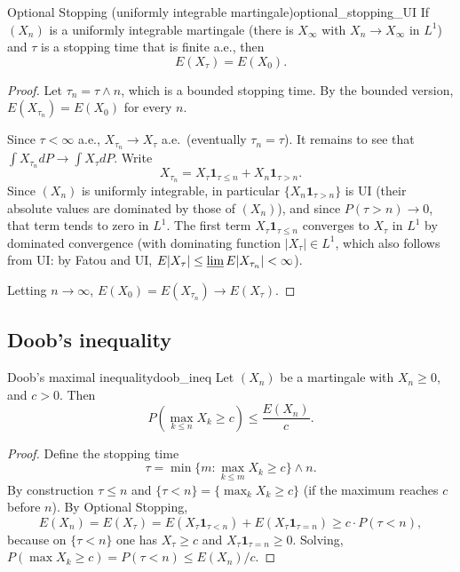 \documentclass[11pt, a4paper]{article}
\begin{document}
\begin{teorema}{Optional Stopping (uniformly integrable martingale)}{optional_stopping_UI}
If $(X_n)$ is a uniformly integrable martingale (there is $X_\infty$ with $X_n \to X_\infty$ in
$L^1$) and $\tau$ is a stopping time that is finite a.e., then
$$ E(X_\tau) = E(X_0). $$
\end{teorema}

\begin{proof}
Let $\tau_n = \tau \wedge n$, which is a bounded stopping time. By the bounded version,
$E(X_{\tau_n}) = E(X_0)$ for every $n$.

Since $\tau < \infty$ a.e., $X_{\tau_n} \to X_\tau$ a.e.\ (eventually $\tau_n = \tau$). It remains
to see that $\int X_{\tau_n} dP \to \int X_\tau dP$. Write
$$ X_{\tau_n} = X_\tau \mathbf{1}_{\tau \le n} + X_n \mathbf{1}_{\tau > n}. $$
Since $(X_n)$ is uniformly integrable, in particular $\{X_n \mathbf{1}_{\tau > n}\}$ is UI (their
absolute values are dominated by those of $(X_n)$), and since $P(\tau > n) \to 0$, that term
tends to zero in $L^1$. The first term $X_\tau \mathbf{1}_{\tau \le n}$ converges to $X_\tau$ in
$L^1$ by dominated convergence (with dominating function $|X_\tau| \in L^1$, which also follows from UI:
by Fatou and UI, $E|X_\tau| \le \varliminf E|X_{\tau_n}| < \infty$).

Letting $n \to \infty$, $E(X_0) = E(X_{\tau_n}) \to E(X_\tau)$.
\end{proof}

\subsection{Doob's inequality}

\begin{teorema}{Doob's maximal inequality}{doob_ineq}
Let $(X_n)$ be a martingale with $X_n \ge 0$, and $c > 0$. Then
$$ P\left(\max_{k \le n} X_k \ge c\right) \le \frac{E(X_n)}{c}. $$
\end{teorema}

\begin{proof}
Define the stopping time
$$ \tau = \min\{m : \max_{k \le m} X_k \ge c\} \wedge n. $$
By construction $\tau \le n$ and $\{\tau < n\} = \{\max_k X_k \ge c\}$ (if the maximum reaches $c$
before $n$). By Optional Stopping,
$$ E(X_n) = E(X_\tau) = E(X_\tau \mathbf{1}_{\tau < n}) + E(X_\tau \mathbf{1}_{\tau = n})
\ge c \cdot P(\tau < n), $$
because on $\{\tau < n\}$ one has $X_\tau \ge c$ and $X_\tau \mathbf{1}_{\tau = n} \ge 0$. Solving,
$P(\max X_k \ge c) = P(\tau < n) \le E(X_n)/c$.
\end{proof}
\end{document}
